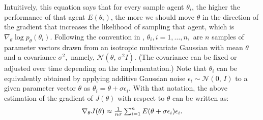 \documentclass{article}
\newcommand{\jc}[1]{\comments{\textcolor{deepForestGreen}{[JC: #1]}}}
\newcommand{\comments}[1]{#1}
\begin{document}
Intuitively, this equation says that for every sample agent $\theta_i$, the higher the performance of that agent $E(\theta_i)$, the more we should move $\theta$ in the direction of the gradient that increases the likelihood of sampling that agent, which is $\nabla_{\theta} \log p_{\theta}(\theta_{i})$. 
Following the convention in \citet{es}, $\theta_{i}, i = 1, \ldots, n,$ are $n$ samples of parameter vectors drawn from an isotropic multivariate Gaussian with mean $\theta$ and a covariance $\sigma^{2},$ namely, $\mathcal{N}(\theta,\,\sigma^{2}I)$. (The covariance can be fixed or adjusted over time depending on the implementation.) Note that $\theta_{i}$ can be equivalently obtained by applying additive Gaussian noise $\epsilon_{i} \sim \mathcal{N}(0,\,I)$ to a given parameter vector $\theta$ as $\theta_{i} = \theta + \sigma\epsilon_{i}$. With that notation, the above estimation of the gradient of $J(\theta)$ with respect to $\theta$ can be written as:
\begin{gather*}\label{eq:2}
\scalebox{1.}{$
\nabla_{\theta}J(\theta) \approx \frac{1}{n\sigma}\sum_{i=1}^{n}E(\theta + \sigma\epsilon_{i})\epsilon_{i}.
$}
\end{gather*}
\end{document}
